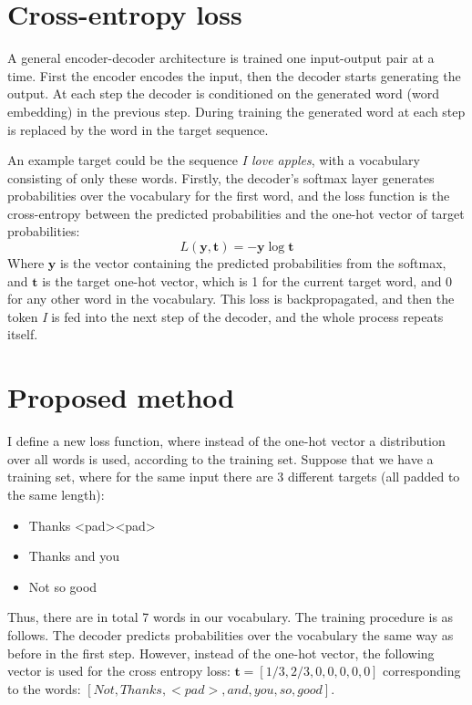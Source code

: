 \documentclass[12pt]{article}
\begin{document}
\section{Cross-entropy loss}
A general encoder-decoder architecture is trained one input-output pair at a time. First the encoder encodes the input, then the decoder starts generating the output. At each step the decoder is conditioned on the generated word (word embedding) in the previous step. During training the generated word at each step is replaced by the word in the target sequence. 

An example target could be the sequence \textit{I love apples}, with a vocabulary consisting of only these words. Firstly, the decoder's softmax layer generates probabilities over the vocabulary for the first word, and the loss function is the cross-entropy between the predicted probabilities and the one-hot vector of target probabilities:
\begin{equation}
L(\bm y,\bm t) = -\bm y \log \bm t
\end{equation}
Where \(\bm y\) is the vector containing the predicted probabilities from the softmax, and \(\bm t\) is the target one-hot vector, which is 1 for the current target word, and 0 for any other word in the vocabulary. This loss is backpropagated, and then the token \textit{I} is fed into the next step of the decoder, and the whole process repeats itself.

\section{Proposed method}
I define a new loss function, where instead of the one-hot vector a distribution over all words is used, according to the training set. Suppose that we have a training set, where for the same input there are 3 different targets (all padded to the same length):
\begin{itemize}
	\item Thanks \textless pad\textgreater \textless pad\textgreater
	\item Thanks and you
	\item Not so good
\end{itemize}

Thus, there are in total 7 words in our vocabulary. The training procedure is as follows. The decoder predicts probabilities over the vocabulary the same way as before in the first step. However, instead of the one-hot vector, the following vector is used for the cross entropy loss:
\(\bm t=[1/3, 2/3, 0, 0, 0, 0, 0]\) corresponding to the words: \([Not, Thanks, <pad>, and, you, so, good]\).
\end{document}
